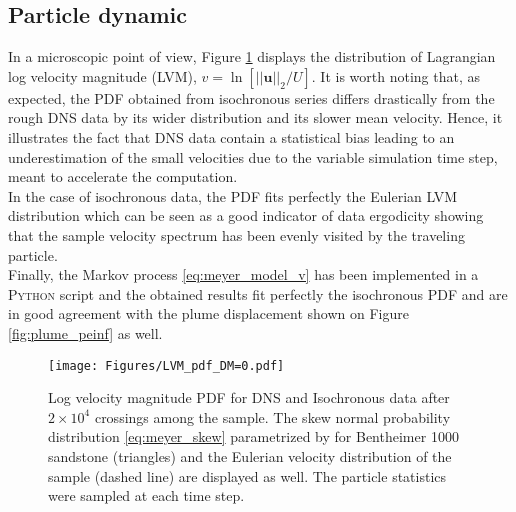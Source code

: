 \subsection{Particle dynamic}
In a microscopic point of view, Figure \ref{fig:lvm_pdf_peinf} displays the distribution of Lagrangian log velocity magnitude (LVM), $v = \ln[||\textbf{u}||_2/U]$. 
It is worth noting that, as expected, the PDF obtained from isochronous series differs drastically from the rough DNS data by its wider distribution and its slower mean velocity.
Hence, it illustrates the fact that DNS data contain a statistical bias leading to an underestimation of the small velocities due to the variable simulation time step, meant to accelerate the computation.\\
In the case of isochronous data, the PDF fits perfectly the Eulerian LVM distribution which can be seen as a good indicator of data ergodicity showing that the sample velocity spectrum has been evenly visited by the traveling particle.\\
Finally, the Markov process \eqref{eq:meyer_model_v} has been implemented in a \textsc{Python} script and the obtained results fit perfectly the isochronous PDF and are in good agreement with the plume displacement shown on Figure \ref{fig:plume_peinf} as well.
\begin{figure}[h]
	\centering
	\texttt{[image: Figures/LVM\_pdf\_DM=0.pdf]}
	\caption{Log velocity magnitude PDF for DNS and Isochronous data after $2\times 10^4$ crossings among the sample. The skew normal probability distribution \eqref{eq:meyer_skew} parametrized by \citet{Meyer2016} for Bentheimer 1000 sandstone (triangles) and the Eulerian velocity distribution of the sample (dashed line) are displayed as well. The particle statistics were sampled at each time step.}
	\label{fig:lvm_pdf_peinf}
\end{figure}


